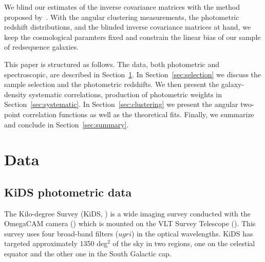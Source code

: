 \documentclass[fleqn,usenatbib,useAMS]{mnras}
\begin{document}
We blind our estimates of the inverse covariance matrices with the method proposed by~\citet{sellentin2019}. With the angular clustering measurements, the photometric redshift distributions, and the blinded inverse covariance matrices at hand, we keep the cosmological paramters fixed and constrain the linear bias of our sample of redsequence galaxies. 


This paper is structured as follows. The data, both photometric and spectroscopic, are described in Section~\ref{sec:data}. In Section~\ref{sec:selection} we discuss the sample selection and the photometric redshifts. We then present the galaxy-density systematic correlations, production of photometric weights in Section~\ref{sec:systematic}. In Section~\ref{sec:clustering} we present the angular two-point correlation functions as well as the theoretical fits. Finally, we summarize and conclude in Section~\ref{sec:summary}. 

\section{Data}\label{sec:data}

\subsection{KiDS photometric data}\label{sec:kids}
The Kilo-degree Survey (KiDS, \citealt{kids}) is a wide 
imaging survey conducted with the OmegaCAM camera (\citealt{omegacam}) which is mounted on the VLT Survey Telescope (\citealt{vst}). This survey uses four broad-band filters ($ugri$) in the optical wavelengths. KiDS has targeted approximately 1350 deg$^2$ of the sky in two regions, one on the celestial equator and the other one in the South Galactic cap. 
\end{document}
